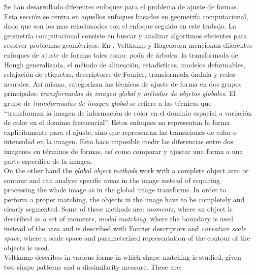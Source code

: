 Se han desarrollado diferentes enfoques para el problema de ajuste de formas.
Esta secci\'on se centra en aquellos enfoques basados en geometr\'ia
computacional, dado que son los mas relacionados con el enfoque
seguido en este trabajo. La geometr\'ia computacional consiste en buscar y 
analizar algoritmos eficientes para resolver problemas geom\'etricos.
En \cite{matchingbook}, Veltkamp y Hagedoorn mencionan diferentes
enfoques de ajuste de formas tales como: poda de \'arboles, la transformada
de Hough generalizada, el m\'etodo de alineaci\'on, estad\'isticas,
modelos deformables, relajaci\'on de etiquetas, descriptores de Fourier,
transformada \'ondula y redes neurales. As\'i mismo, categorizan las 
t\'ecnicas de ajuste de forma en dos grupos principales:
\emph{transformadas de imagen global} y \emph{m\'etodos de objetos globales}.
El grupo de \emph{transformadas de imagen global} se refiere a las 
t\'ecnicas que ``transforman la imagen de informaci\'on de color en
el dominio espacial a variaci\'on de color en el dominio frecuencial''.
Estos enfoques no representan la forma expl\'icitamente para el ajuste,
sino que representan las transiciones de color o intensidad en
la imagen. Esto hace imposible medir las diferencias entre dos
imagenes en t\'erminos de formas, as\'i como comparar y ajustar
una forma a una parte espec\'ifica de la imagen.\\


On the other hand the \emph{global object methods} work with a complete
object area or contour and can analyze specific areas in the 
image instead of requiring processing the whole image as in 
the global image transforms. In order to perform a proper
matching, the objects in the image have to be completely and
clearly segmented. Some of these methods are: \emph{moments}, where an
object is described as a set of moments, \emph{modal matching},
where the boundary is used instead of the area and is described 
with Fourier descriptors and \emph{curvature scale space}, where a
scale space and parameterized representation of the contour of the 
objects is used.\\

Veltkamp describes in \cite{matching2} various forms in
which shape matching is studied, given two shape patterns
and a dissimilarity measure. These are:

